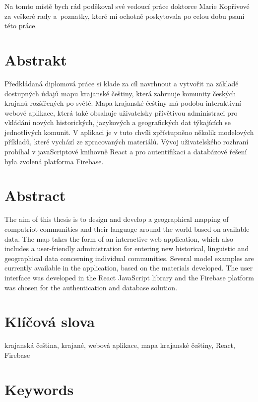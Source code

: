 \documentclass[a4paper,12pt,openany,twoside]{book} %
\begin{document}
Na tomto místě bych rád poděkoval své vedoucí práce doktorce Marie Kopřivové za veškeré rady a~poznatky, které mi ochotně poskytovala po celou dobu psaní této práce.

\clearpage

\section*{Abstrakt}

Předkládaná diplomová práce si klade za cíl navrhnout a vytvořit na základě dostupných údajů mapu krajanské češtiny, která zahrnuje komunity českých krajanů rozšířených po světě. Mapa krajanské češtiny má podobu interaktivní webové aplikace, která také obsahuje uživatelsky přívětivou administraci pro vkládání nových historických, jazykových a geografických dat týkajících se jednotlivých komunit. V aplikaci je v tuto chvíli zpřístupněno několik modelových příkladů, které vychází ze zpracovaných materiálů. Vývoj uživatelského rozhraní probíhal v javaScriptové knihovně React a pro autentifikaci a databázové řešení byla zvolená platforma Firebase.

\section*{Abstract}

The aim of this thesis is to design and develop a geographical mapping of compatriot communities and their language around the world based on available data. The map takes the form of an interactive web application, which also includes a user-friendly administration for entering new historical, linguistic and geographical data concerning individual communities. Several model examples are currently available in the application, based on the materials developed. The user interface was developed in the React JavaScript library and the Firebase platform was chosen for the authentication and database solution.

\section*{Klíčová slova}

krajanská čeština, krajané, webová aplikace, mapa krajanské češtiny, React, Firebase

\section*{Keywords}
\end{document}
